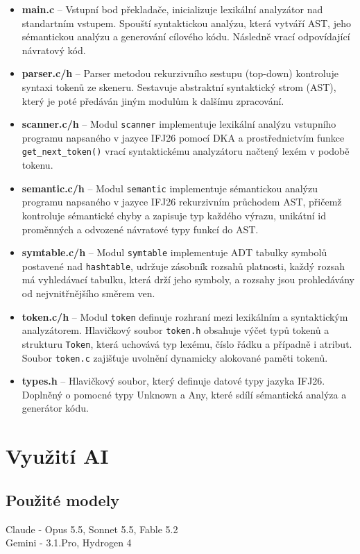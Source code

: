 \documentclass[]{ifjclass}
\begin{document}
\begin{itemize}
        \item \textbf{main.c} -- Vstupní bod překladače, inicializuje lexikální analyzátor nad standartním vstupem. Spouští syntaktickou analýzu, která vytváří AST, jeho sémantickou analýzu a generování cílového kódu. Následně vrací odpovídající návratový kód.
        \item \textbf{parser.c/h} -- Parser metodou rekurzivního sestupu (top-down) kontroluje syntaxi tokenů ze skeneru. Sestavuje abstraktní syntaktický strom (AST), který je poté předáván jiným modulům k dalšímu zpracování.
        \item \textbf{scanner.c/h} -- Modul \texttt{scanner} implementuje lexikální analýzu vstupního programu napsaného v jazyce IFJ26 pomocí DKA a prostřednictvím funkce \texttt{get\_next\_token()} vrací syntaktickému analyzátoru načtený lexém v podobě tokenu.
        \item \textbf{semantic.c/h} -- Modul \texttt{semantic} implementuje sémantickou analýzu programu napsaného v jazyce IFJ26 rekurzivním průchodem AST, přičemž kontroluje sémantické chyby a zapisuje typ každého výrazu, unikátní id proměnných a odvozené návratové typy funkcí do AST.
        
        \item \textbf{symtable.c/h} -- Modul \texttt{symtable} implementuje ADT tabulky symbolů postavené nad \texttt{hashtable}, udržuje zásobník rozsahů platnosti, každý rozsah má vyhledávací tabulku, která drží jeho symboly, a rozsahy jsou prohledávány od nejvnitřnějšího směrem ven.
        
        \item \textbf{token.c/h} -- Modul \texttt{token} definuje rozhraní mezi lexikálním a syntaktickým analyzátorem. Hlavičkový soubor \texttt{token.h} obsahuje výčet typů tokenů a strukturu \texttt{Token}, která uchovává typ lexému, číslo řádku a případně i atribut. Soubor \texttt{token.c} zajišťuje uvolnění dynamicky alokované paměti tokenů.
        \item \textbf{types.h} -- Hlavičkový soubor, který definuje datové typy jazyka IFJ26. Doplněný o pomocné typy Unknown a Any, které sdílí sémantická analýza a generátor kódu.
        \end{itemize}
    \newpage
    \section{Využití AI}
        \subsection{Použité modely}
            Claude - Opus 5.5, Sonnet 5.5, Fable 5.2 \\
            Gemini - 3.1.Pro, Hydrogen 4
\end{document}
